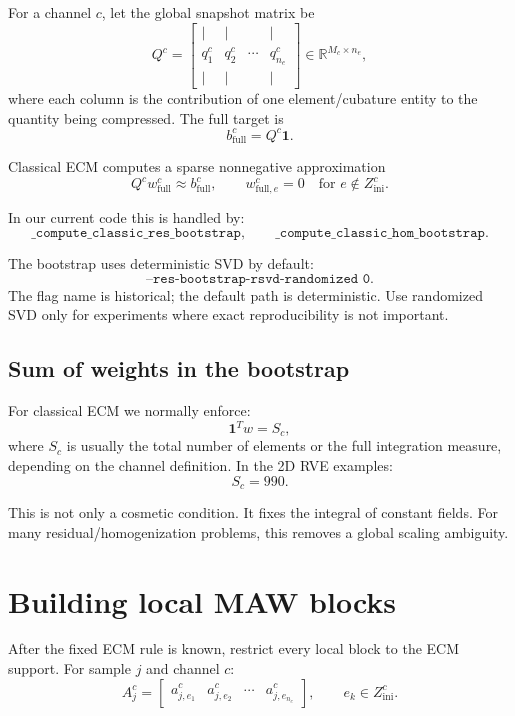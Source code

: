 \documentclass[11pt]{article}
\newcommand{\R}{\mathbb{R}}
\newcommand{\zinit}{Z_{\mathrm{ini}}}
\newcommand{\bone}{\mathbf{1}}
\begin{document}
For a channel \(c\), let the global snapshot matrix be
\[
  Q^c =
  \begin{bmatrix}
  | & | & & |\\
  q_1^c & q_2^c & \cdots & q_{n_e}^c\\
  | & | & & |
  \end{bmatrix}
  \in\R^{M_c\times n_e},
\]
where each column is the contribution of one element/cubature entity to the
quantity being compressed.  The full target is
\[
  b^c_{\mathrm{full}} = Q^c \bone.
\]

Classical ECM computes a sparse nonnegative approximation
\[
  Q^c w_{\mathrm{full}}^c \approx b^c_{\mathrm{full}},
  \qquad
  w_{\mathrm{full},e}^c=0\quad\text{for }e\notin \zinit^c.
\]

In our current code this is handled by:
\[
  \texttt{\_compute\_classic\_res\_bootstrap},
  \qquad
  \texttt{\_compute\_classic\_hom\_bootstrap}.
\]

The bootstrap uses deterministic SVD by default:
\[
  \texttt{--res-bootstrap-rsvd-randomized 0}.
\]
The flag name is historical; the default path is deterministic.  Use randomized
SVD only for experiments where exact reproducibility is not important.

\subsection{Sum of weights in the bootstrap}

For classical ECM we normally enforce:
\[
  \bone^T w = S_c,
\]
where \(S_c\) is usually the total number of elements or the full integration
measure, depending on the channel definition.  In the 2D RVE examples:
\[
  S_c = 990.
\]

This is not only a cosmetic condition.  It fixes the integral of constant fields.
For many residual/homogenization problems, this removes a global scaling ambiguity.

\section{Building local MAW blocks}

After the fixed ECM rule is known, restrict every local block to the ECM support.
For sample \(j\) and channel \(c\):
\[
  A_j^c =
  \begin{bmatrix}
    a_{j,e_1}^c & a_{j,e_2}^c & \cdots & a_{j,e_{n_c}}^c
  \end{bmatrix},
  \qquad
  e_k\in\zinit^c.
\]
\end{document}
